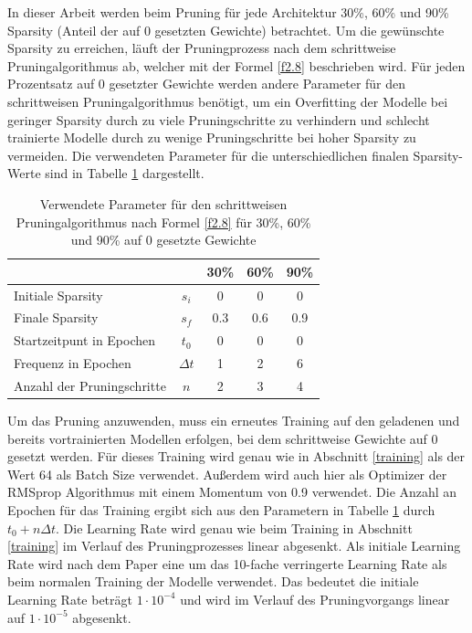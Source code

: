 In dieser Arbeit werden beim Pruning für jede Architektur 30\%, 60\% und 90\% Sparsity (Anteil der auf 0 gesetzten Gewichte) betrachtet. Um die gewünschte Sparsity zu erreichen, läuft der Pruningprozess nach dem schrittweise Pruningalgorithmus ab, welcher mit der Formel \ref{f2.8} beschrieben wird. Für jeden Prozentsatz auf 0 gesetzter Gewichte werden andere Parameter für den schrittweisen Pruningalgorithmus benötigt, um ein Overfitting der Modelle bei geringer Sparsity durch zu viele Pruningschritte zu verhindern und schlecht trainierte Modelle durch zu wenige Pruningschritte bei hoher Sparsity zu vermeiden. Die verwendeten Parameter für die unterschiedlichen finalen Sparsity-Werte sind in Tabelle \ref{t3.1} dargestellt.

\begin{table}[ht]
\centering
\begin{tabular}{l|c|ccc}
                           &            & 30\% & 60\% & 90\% \\
\hline
Initiale Sparsity          & $s_i$      & 0    & 0    & 0    \\
Finale Sparsity            & $s_f$      & 0.3  & 0.6  & 0.9  \\
Startzeitpunt in Epochen   & $t_0$      & 0    & 0    & 0    \\
Frequenz in Epochen        & $\Delta t$ & 1    & 2    & 6    \\
Anzahl der Pruningschritte & $n$        & 2    & 3    & 4    \\
\end{tabular}
\caption{Verwendete Parameter für den schrittweisen Pruningalgorithmus nach Formel \ref{f2.8} für 30\%, 60\% und 90\% auf 0 gesetzte Gewichte}
\label{t3.1}
\end{table}

Um das Pruning anzuwenden, muss ein erneutes Training auf den geladenen und bereits vortrainierten Modellen erfolgen, bei dem schrittweise Gewichte auf 0 gesetzt werden. Für dieses Training wird genau wie in Abschnitt \ref{training} als der Wert 64 als Batch Size verwendet. Außerdem wird auch hier als Optimizer der RMSprop Algorithmus mit einem Momentum von 0.9 verwendet. Die Anzahl an Epochen für das Training ergibt sich aus den Parametern in Tabelle \ref{t3.1} durch $t_0 + n \Delta t$. Die Learning Rate wird genau wie beim Training in Abschnitt \ref{training} im Verlauf des Pruningprozesses linear abgesenkt. Als initiale Learning Rate wird nach dem Paper \cite{zhu_prune_2017} eine um das 10-fache verringerte Learning Rate als beim normalen Training der Modelle verwendet. Das bedeutet die initiale Learning Rate beträgt $1 \cdot 10^{-4}$ und wird im Verlauf des Pruningvorgangs linear auf $1 \cdot 10^{-5}$ abgesenkt.

